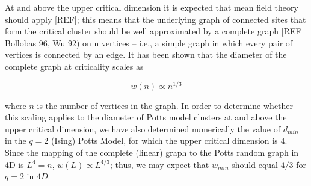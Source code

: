 \documentclass[pre,preprint,11pt]{revtex4}
\newcommand{\lb}{{\langle}}
\newcommand{\rb}{{\rangle}}
\begin{document}
At and above the upper critical dimension it is expected that mean field theory should apply [REF]; this means that the underlying graph of connected sites that form the critical cluster should be well approximated by a complete graph [REF Bollobas 96, Wu 92) on n vertices -- i.e., a simple graph in which every pair of vertices is connected by an edge. It has been shown \cite{Nachmiasa} that the diameter of the complete graph at criticality scales as

\begin {equation}
w(n) \propto n^{1/3}
\end {equation}

where $n$ is the number of vertices in the graph.  In order to determine whether this scaling applies to the diameter of Potts model clusters at and above the upper critical dimension, we have also determined numerically the value of $d_{min}$ in the $q=2$ (Ising) Potts Model, for which the upper critical dimension is $4$.  Since the mapping of the complete (linear) graph to the Potts random graph in 4D is $L^4=n$, $w(L) \propto L^{4/3}$; thus, we may expect that $w_{min}$ should equal $4/3$ for $q=2$ in $4D$.



\end{document}
